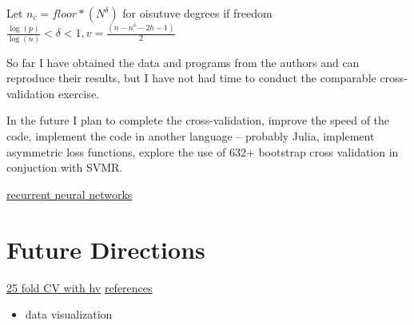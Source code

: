\documentclass[12pt]{article}
\begin{document}
Let $n_c= floor*(N^\delta)$ for oisutuve degrees if freedom $\frac{\log(p)}{\log(n)}<\delta<1, v=\frac{(n-n^\delta-2h-1)}{2}$


So far  I have
 obtained the data and programs from the authors and can reproduce 
their results, but I have not had 
time to conduct the comparable cross-validation exercise.

In the future I plan to complete the cross-validation,
improve the speed of the code,
implement the code in another language -- probably Julia,
implement asymmetric loss functions,
explore the use of 632+ bootstrap cross validation in conjuction with 
SVMR.

\href{http://www.wildml.com/2015/09/recurrent-neural-networks-tutorial-part-1-introduction-to-rnns/}{recurrent neural networks}

\section{Future Directions}
\label{sec:future-directions}

\cite{journals/ijon/Cao03,conf/icml/TaiebH14}

\href{https://www.researchgate.net/figure/51762586_fig2_Fig-2-Cross-validation-error-estimate-obtained-by-25-fold-cross-validation-with-Ridge}{25 fold CV with hv}
\href{http://www.svms.org/regression/}{references}
\begin{itemize}
\item data visualization
\end{itemize}



\end{document}
